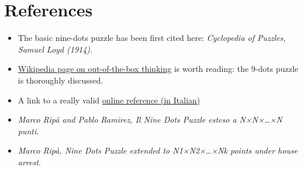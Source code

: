 \documentclass[11pt]{article}
\begin{document}
\hypertarget{references}{
	\section{References}
	\label{references}
}

\begin{itemize}
	\item
		The basic nine-dots puzzle has been first cited here: \emph{Cyclopedia of Puzzles, Samuel Loyd (1914)}.
	\item
	\href{https://en.wikipedia.org/wiki/Thinking_outside_the_box}{Wikipedia page on out-of-the-box thinking} is worth reading: the 9-dots puzzle is thoroughly discussed.
	\item
		A link to a really valid \href{http://utenti.quipo.it/base5/geopiana/loyd9punti4linee.htm}{online reference (in Italian)}
	\item
		\emph{Marco Ripà and Pablo Ramirez, Il Nine Dots Puzzle esteso a N×N×\ldots×N punti}.
	\item
		\emph{Marco Ripà, Nine Dots Puzzle extended to N1×N2×\ldots×Nk points 	under house arrest}.
\end{itemize}
\end{document}
